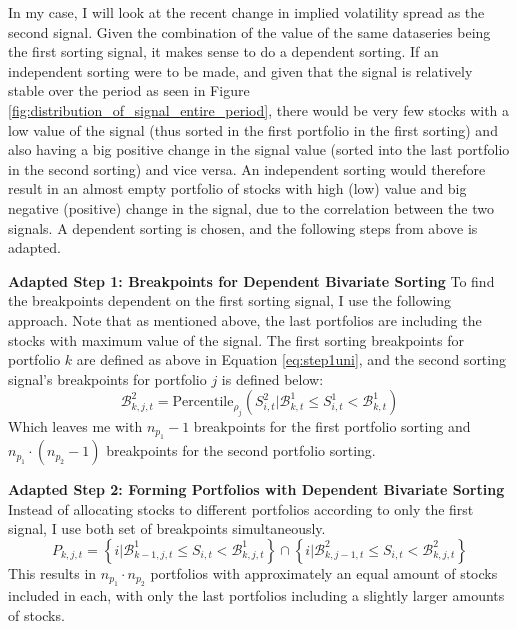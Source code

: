 In my case, I will look at the recent change in implied volatility spread as the second signal. Given the combination of the value of the same dataseries being the first sorting signal, it makes sense to do a dependent sorting. If an independent sorting were to be made, and given that the signal is relatively stable over the period as seen in Figure \ref{fig:distribution_of_signal_entire_period}, there would be very few stocks with a low value of the signal (thus sorted in the first portfolio in the first sorting) and also having a big positive change in the signal value (sorted into the last portfolio in the second sorting) and vice versa. An independent sorting would therefore result in an almost empty portfolio of stocks with high (low) value and big negative (positive) change in the signal, due to the correlation between the two signals. A dependent sorting is chosen, and the following steps from above is adapted.

\textbf{Adapted Step 1: Breakpoints for Dependent Bivariate Sorting} To find the breakpoints dependent on the first sorting signal, I use the following approach. Note that as mentioned above, the last portfolios are including the stocks with maximum value of the signal. The first sorting breakpoints for portfolio $k$ are defined as above in Equation \ref{eq:step1uni}, and the second sorting signal's breakpoints for portfolio $j$ is defined below:
\begin{equation}
	\mathcal{B}_{k,j,t}^{2}=\text{Percentile}_{\rho_{j}}\left(S_{i,t}^{2}|\mathcal{B}_{k,t}^{1}\leq S_{i,t}^{1}<\mathcal{B}_{k,t}^{1}\right)
\end{equation}
Which leaves me with $n_{p_{1}} - 1$ breakpoints for the first portfolio sorting and $n_{p_{1}} \cdot \left(n_{p_{2}} - 1\right)$ breakpoints for the second portfolio sorting. 

\textbf{Adapted Step 2: Forming Portfolios with Dependent Bivariate Sorting} Instead of allocating stocks to different portfolios according to only the first signal, I use both set of breakpoints simultaneously.
\begin{equation}
	P_{k,j,t}=\left\{ i|\mathcal{B}_{k-1,j,t}^{1}\leq S_{i,t}<\mathcal{B}_{k,j,t}^{1}\right\} \cap\left\{ i|\mathcal{B}_{k,j-1,t}^{2}\leq S_{i,t}<\mathcal{B}_{k,j,t}^{2}\right\} 
\end{equation}
This results in $n_{p_{1}}\cdot n_{p_{2}}$ portfolios with approximately an equal amount of stocks included in each, with only the last portfolios including a slightly larger amounts of stocks.

